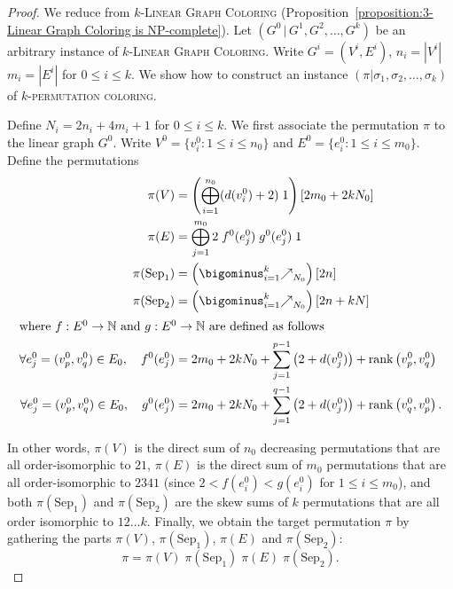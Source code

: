 \begin{proof}
  We reduce from \textsc{$k$-Linear Graph Coloring} (Proposition~\ref{proposition:3-Linear Graph Coloring is NP-complete}).
  Let $(G^{0} \,|\, G^{1}, G^{2}, \dots, G^{k})$ be an arbitrary instance of \textsc{$k$-Linear Graph Coloring}.
  Write $G^{i} = (V^i, E^i)$,
  $n_i = |V^i|$ $m_i = |E^i|$ for $0 \leq i \leq k$.
  We show how to construct an instance
  $(\pi | \sigma_1, \sigma_2, \dots, \sigma_k)$ of
  \textsc{$k$-permutation coloring}.

  Define $N_i = 2n_i + 4m_i + 1$ for $0 \leq i \leq k$.
  We first associate the permutation $\pi$ to the linear graph $G^{0}$.
  Write $V^0 = \{v^0_i : 1 \leq i \leq n_0\}$ and
  $E^0 = \{e^0_i : 1 \leq i \leq m_0\}$.
  Define the permutations
  \begin{align*}
    \pi(V)
    &=
    \left(\bigoplus_{i=1}^{n_0} (d(v^0_i)+2) \; 1\right) [2m_0+2kN_0]
    \\
    \pi(E)
    &=
    \bigoplus_{j=1}^{m_0} 2 \; f^0(e^0_j) \; g^0(e^0_j) \; 1
    \\
    \pi(\text{Sep}_1)
    &=
    \left(\bigominus_{i=1}^{k} \mathbf{\nearrow}_{N_0}\right) [2n]
    \\
    \pi(\text{Sep}_2)
    &=
    \left(\bigominus_{i=1}^{k} \mathbf{\nearrow}_{N_0}\right) [2n+kN]
    \\
    \intertext{where $f : E^0 \to \mathbb{N}$ and $g : E^0 \to \mathbb{N}$
    are defined as follows}
    \forall e^0_j = (v^0_p, v^0_q) \in E_0,\quad f^0(e^0_j)
    &=
    2m_0 + 2kN_0 + \sum_{j=1}^{p-1}\left(2+d(v^0_j)\right) + \RANK\left(v^0_p, v^0_q\right)
    \\
    \forall e^0_j = (v^0_p, v^0_q) \in E_0,\quad g^0(e^0_j)
    &=
    2m_0 + 2kN_0 + \sum_{j=1}^{q-1}\left(2+d(v^0_j)\right) + \RANK\left(v^0_q, v^0_p\right)\text{.}
    \end{align*}

    In other words,
    $\pi(V)$ is the direct sum of $n_0$ decreasing permutations
    that are all order-isomorphic to $21$,
    $\pi(E)$ is the direct sum of $m_0$ permutations that are all
    order-isomorphic to $2341$ (since $2 < f(e^0_i) < g(e^0_i)$
    for $1 \leq i \leq m_0$), and
    both $\pi(\text{Sep}_1)$ and $\pi(\text{Sep}_2)$ are the skew sums
    of $k$ permutations that are all order isomorphic to $12 \dots k$.
    Finally, we obtain the target permutation $\pi$ by gathering the parts
    $\pi(V)$, $\pi(\text{Sep}_1)$, $\pi(E)$ and $\pi(\text{Sep}_2)$:
    $$
      \pi =
      \pi(V)   \;
      \pi(\text{Sep}_1) \;
      \pi(E)   \;
      \pi(\text{Sep}_2)\text{.}
    $$



\end{proof}
